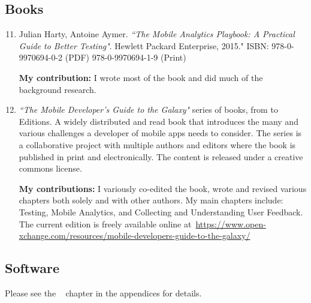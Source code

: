 \subsection{Books}
\begin{enumerate}
    \setcounter{enumi}{10}
    \item Julian Harty, Antoine Aymer. \emph{``The Mobile Analytics Playbook: A Practical Guide to Better Testing"}. Hewlett Packard Enterprise, 2015."
    ISBN: 978-0-9970694-0-2 (PDF) 978-0-9970694-1-9 (Print)
    
    \textbf{My contribution:} I wrote most of the book and did much of the background research.
    
    \item \emph{``The Mobile Developer's Guide to the Galaxy"} series of books, from  to  Editions. A widely distributed and read book that introduces the many and various challenges a developer of mobile apps needs to consider. The series is a collaborative project with multiple authors and editors where the book is published in print and electronically. The content is released under a creative commons license. 
    
    \textbf{My contributions:} I variously co-edited the book, wrote and revised various chapters both solely and with other authors. My main chapters include: Testing, Mobile Analytics, and Collecting and Understanding User Feedback. The current edition is freely available online at~\url{https://www.open-xchange.com/resources/mobile-developers-guide-to-the-galaxy/}
\end{enumerate}

\subsection{Software}
Please see the ~\hyperlink{software-contributions-chapter}{\emph{}} chapter in the appendices for details. 
\clearpage
